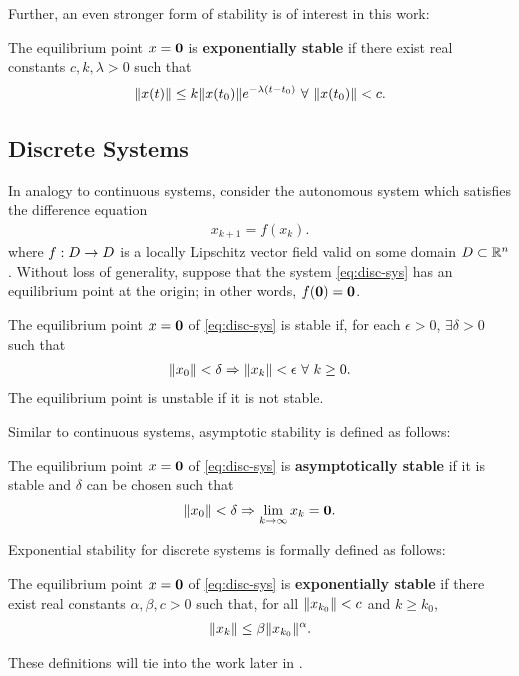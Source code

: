 Further, an even stronger form of stability is of interest in this work:
%
\begin{definition}
  The equilibrium point $x = {\mathbf 0}$ is {\bf exponentially stable} if there
  exist real constants $c, k, \lambda > 0$ such that
  \begin{align*}
    \nxt \leq k \nxtnaught e^{-\lambda (t - t_{0})} \ \forall \ \nxtnaught
    < c.
  \end{align*}
\end{definition}


\subsection{Discrete Systems}

In analogy to continuous systems, consider the autonomous system which satisfies
the difference equation
\begin{align}
  \label{eq:disc-sys}
  x_{k+1} = f(x_{k}).
\end{align}
where $f : D \to D$ is a locally Lipschitz vector field valid on some domain
$D \subset \mathbb{R}^{n}$.
%
Without loss of generality, suppose that the system \eqref{eq:disc-sys} has an
equilibrium point at the origin;
%
in other words, $f({\mathbf 0}) = {\mathbf 0}$.
%
\begin{definition}
  The equilibrium point $x = {\mathbf 0}$ of \eqref{eq:disc-sys} is stable if,
  for each $\epsilon > 0$, $\exists \delta > 0$ such that
  \begin{align*}
    \|x_{0}\| < \delta \Rightarrow \|x_{k}\| < \epsilon \ \forall \ k
    \geq 0.
  \end{align*}
  The equilibrium point is unstable if it is not stable.
\end{definition}
%
Similar to continuous systems, asymptotic stability is defined as follows:
%
\begin{definition}
  The equilibrium point $x = {\mathbf 0}$ of \eqref{eq:disc-sys} is {\bf
    asymptotically stable} if it is stable and $\delta$ can be chosen such that
  \begin{align*}
    \|x_{0}\| < \delta \Rightarrow \lim_{k \to \infty} x_{k} = {\mathbf 0}.
  \end{align*}
\end{definition}
%
Exponential stability for discrete systems is formally defined as follows:
%
\begin{definition}
  The equilibrium point $x = {\mathbf 0}$ of \eqref{eq:disc-sys} is {\bf
    exponentially stable} if there exist real constants $\alpha, \beta, c> 0$
  such that, for all $\|x_{k_{0}}\| < c$ and $k \geq k_{0}$,
  \begin{align*}
    \|x_{k}\| \leq \beta \|x_{k_{0}}\|^{\alpha}.
  \end{align*}
\end{definition}
%
These definitions will tie into the work later in .

